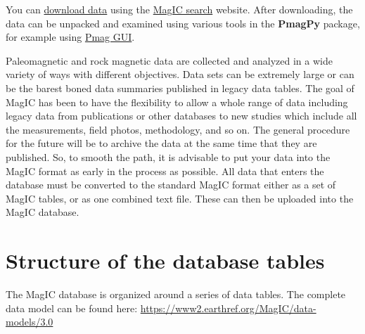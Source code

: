 \documentclass[11pt]{book}
\begin{document}
{{You can \href{#magic_download}{download data} using the \href{http://earthref.org/MAGIC/search}{MagIC search} website.
%
%
%
       After downloading, the data can be unpacked and examined using various tools in the {\bf PmagPy}  package, for example using \href{#pmag_gui.py}{Pmag GUI}.

%

Paleomagnetic and rock magnetic data are collected and analyzed in a wide variety of ways with different objectives.  Data sets can be extremely large or can be the barest boned data summaries published in legacy data tables.   The goal of MagIC has been to have the flexibility to allow a whole range of data including legacy data from publications or other databases to new studies which include all the measurements, field photos, methodology, and so on.  The general procedure for the future will be to archive the data at the same time that they are published.    So, to smooth the path, it is advisable to put your data into the MagIC format as early in the process as possible.  All data that enters the database must be converted to the standard MagIC format either as a set of MagIC tables, or as one combined text file.    These can then be uploaded into the MagIC database.


\section{Structure of the database tables}

The MagIC database is organized around a series of data tables.  The complete data model can be found here:
\url{https://www2.earthref.org/MagIC/data-models/3.0}

}}
\end{document}
